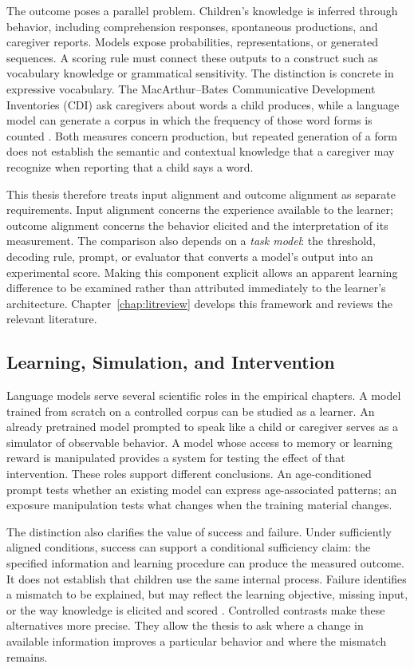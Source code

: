 The outcome poses a parallel problem. Children's knowledge is inferred through behavior, including comprehension responses, spontaneous productions, and caregiver reports. Models expose probabilities, representations, or generated sequences. A scoring rule must connect these outputs to a construct such as vocabulary knowledge or grammatical sensitivity. The distinction is concrete in expressive vocabulary. The MacArthur--Bates Communicative Development Inventories (CDI) ask caregivers about words a child produces, while a language model can generate a corpus in which the frequency of those word forms is counted \citep{fenson2007macarthur,frank2017wordbank}. Both measures concern production, but repeated generation of a form does not establish the semantic and contextual knowledge that a caregiver may recognize when reporting that a child says a word.

This thesis therefore treats input alignment and outcome alignment as separate requirements. Input alignment concerns the experience available to the learner; outcome alignment concerns the behavior elicited and the interpretation of its measurement. The comparison also depends on a \emph{task model}: the threshold, decoding rule, prompt, or evaluator that converts a model's output into an experimental score. Making this component explicit allows an apparent learning difference to be examined rather than attributed immediately to the learner's architecture. Chapter~\ref{chap:litreview} develops this framework and reviews the relevant literature.

\subsection{Learning, Simulation, and Intervention}

Language models serve several scientific roles in the empirical chapters. A model trained from scratch on a controlled corpus can be studied as a learner. An already pretrained model prompted to speak like a child or caregiver serves as a simulator of observable behavior. A model whose access to memory or learning reward is manipulated provides a system for testing the effect of that intervention. These roles support different conclusions. An age-conditioned prompt tests whether an existing model can express age-associated patterns; an exposure manipulation tests what changes when the training material changes.

The distinction also clarifies the value of success and failure. Under sufficiently aligned conditions, success can support a conditional sufficiency claim: the specified information and learning procedure can produce the measured outcome. It does not establish that children use the same internal process. Failure identifies a mismatch to be explained, but may reflect the learning objective, missing input, or the way knowledge is elicited and scored \citep{dupoux2018cognitive,warstadt2022what}. Controlled contrasts make these alternatives more precise. They allow the thesis to ask where a change in available information improves a particular behavior and where the mismatch remains.

